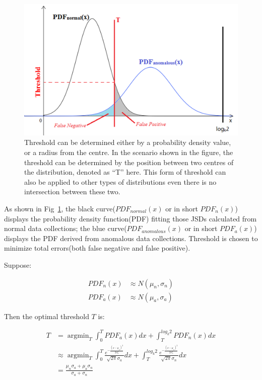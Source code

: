 \documentclass[10pt,conference,letterpaper]{IEEEtran}
\begin{document}
			\begin{figure}[!t]
				\centering
				\includegraphics[width=\linewidth]{fig/ExampleThreshold.png}
				\caption{Threshold can be determined either by a probability density value, or a radius from the centre. In the scenario shown in the figure, the threshold can be determined by the position between two centres of the distribution, denoted as ``T'' here. This form of threshold can also be applied to other types of distributions even there is no intersection between these two.}
				\label{fig:example-threshold}
			\end{figure}
	
			As shown in Fig~\ref{fig:example-threshold}, the black curve($PDF_{normal}(x)$ or in short $PDF_n(x)$) displays the probability density function(PDF) fitting those JSDs calculated from normal data collections; the blue curve($PDF_{anomalous}(x)$ or in short $PDF_a(x)$) displays the PDF derived from anomalous data collections. Threshold is chosen to minimize total errors(both false negative and false positive).
			
			Suppose:
	
			\begin{align}
				PDF_{n}(x) &\approx N(\mu_n, \sigma_n)\\
				PDF_{a}(x) &\approx N(\mu_a, \sigma_a)
			\end{align}
			
			Then the optimal threshold $T$ is:
	
			\begin{equation}\label{equ:linear-weight}
				\begin{split}
					T &= \mathop{\arg\min}_{T} \int_{0}^{T}PDF_{a}(x)dx +
					\int_{T}^{log_k2}PDF_{n}(x)dx\\
					& \approx \mathop{\arg\min}_{T}
					\int_{0}^{T}
					\frac{e^{-\frac{(x - \mu_a)^2}{2\sigma_a^2}}}{\sqrt{2\pi} \sigma_a}dx
					+ \int_{T}^{log_k2}
					\frac{e^{-\frac{(x - \mu_n)^2}{2\sigma_n^2}}}{\sqrt{2\pi} \sigma_n}dx\\
					& = \frac{\mu_n\sigma_a + \mu_a\sigma_n}{\sigma_a + \sigma_n}
				\end{split}
			\end{equation}
	
\end{document}
